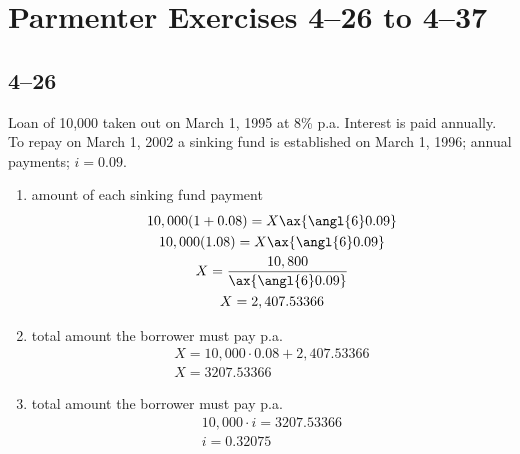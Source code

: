 \documentclass[a4paper, 12pt, reqno]{amsart}
\title{\titl}
\author{Moritz M. Konarski}
\date{\today}
\numberwithin{equation}{section}
\begin{document}
\maketitle

\section*{Parmenter Exercises 4--26 to 4--37}

\subsection*{4--26}

Loan of 10,000 taken out on March 1, 1995 at 8\% p.a. Interest is paid
annually. To repay on March 1, 2002 a sinking fund is established on March 1,
1996; annual payments; $i=0.09$.
\begin{enumerate}[label=(alph*)]
    \item amount of each sinking fund payment
        \begin{equation}\nonumber
            \begin{gathered}
                10,000(1+0.08) = X \ax{\angl{6}0.09}     \\
                10,000(1.08) = X \ax{\angl{6}0.09}     \\
                X = \frac{10,800}{\ax{\angl{6}0.09}}         \\
                X = 2,407.53366
            \end{gathered}
        \end{equation}
    \item total amount the borrower must pay p.a.
        \begin{equation}\nonumber
            \begin{gathered}
                X = 10,000 \cdot 0.08 + 2,407.53366  \\
                X = 3207.53366
            \end{gathered}
        \end{equation}
    \item total amount the borrower must pay p.a.
        \begin{equation}\nonumber
            \begin{gathered}
                10,000 \cdot i = 3207.53366     \\
                i = 0.32075
            \end{gathered}
        \end{equation}
\end{enumerate}
\end{document}
